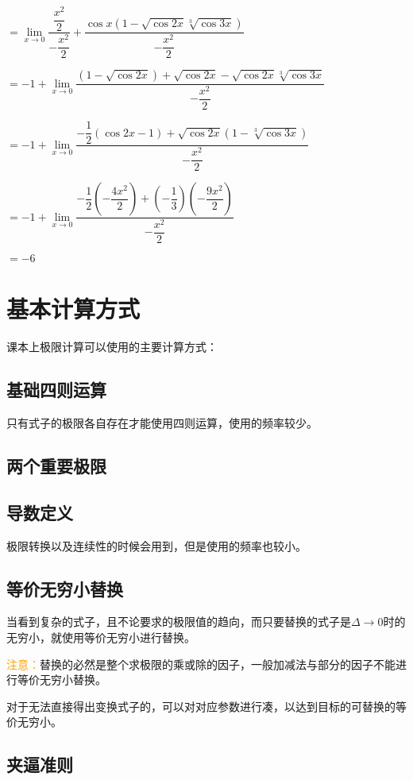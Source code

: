 \documentclass[UTF8, 12pt]{ctexart}
\begin{document}
$=\lim\limits_{x\to 0}\dfrac{\dfrac{x^2}{2}}{-\dfrac{x^2}{2}}+\dfrac{\cos x(1-\sqrt{\cos 2x}\sqrt[3]{\cos 3x})}{-\dfrac{x^2}{2}}$

$=-1+\lim\limits_{x\to 0}\dfrac{(1-\sqrt{\cos 2x})+\sqrt{\cos 2x}-\sqrt{\cos 2x}\sqrt[3]{\cos 3x}}{-\dfrac{x^2}{2}}$

$=-1+\lim\limits_{x\to 0}\dfrac{-\dfrac{1}{2}(\cos 2x-1)+\sqrt{\cos 2x}(1-\sqrt[3]{\cos 3x})}{-\dfrac{x^2}{2}}$

$=-1+\lim\limits_{x\to 0}\dfrac{-\dfrac{1}{2}(-\dfrac{4x^2}{2})+\left(-\dfrac{1}{3}\right)\left(-\dfrac{9x^2}{2}\right)}{-\dfrac{x^2}{2}}$

$=-6$

\section{基本计算方式}

课本上极限计算可以使用的主要计算方式：

\subsection{基础四则运算}

只有式子的极限各自存在才能使用四则运算，使用的频率较少。

\subsection{两个重要极限}

\subsection{导数定义}

极限转换以及连续性的时候会用到，但是使用的频率也较小。

\subsection{等价无穷小替换}

当看到复杂的式子，且不论要求的极限值的趋向，而只要替换的式子是$\Delta\to 0$时的无穷小，就使用等价无穷小进行替换。

\textcolor{orange}{注意：}替换的必然是整个求极限的乘或除的因子，一般加减法与部分的因子不能进行等价无穷小替换。

对于无法直接得出变换式子的，可以对对应参数进行凑，以达到目标的可替换的等价无穷小。

\subsection{夹逼准则}
\end{document}
